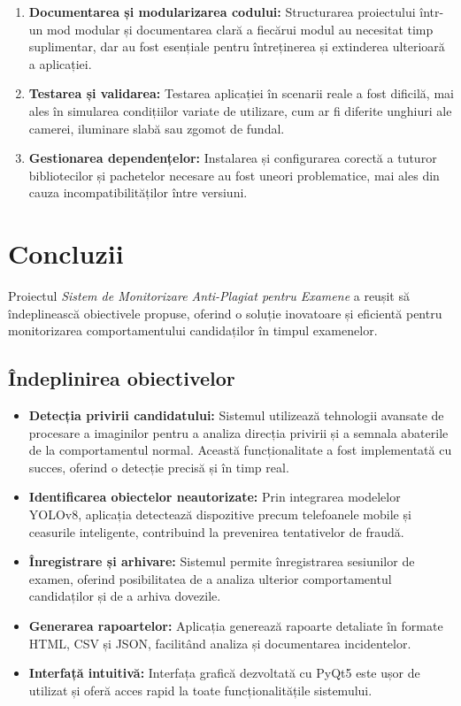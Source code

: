 \documentclass[12pt,a4paper]{article}
\begin{document}
\begin{enumerate}
    \item \textbf{Documentarea și modularizarea codului:} Structurarea proiectului într-un mod modular și documentarea clară a fiecărui modul au necesitat timp suplimentar, dar au fost esențiale pentru întreținerea și extinderea ulterioară a aplicației.

    \item \textbf{Testarea și validarea:} Testarea aplicației în scenarii reale a fost dificilă, mai ales în simularea condițiilor variate de utilizare, cum ar fi diferite unghiuri ale camerei, iluminare slabă sau zgomot de fundal.

    \item \textbf{Gestionarea dependențelor:} Instalarea și configurarea corectă a tuturor bibliotecilor și pachetelor necesare au fost uneori problematice, mai ales din cauza incompatibilităților între versiuni.
\end{enumerate}

\section{Concluzii}

Proiectul \textit{Sistem de Monitorizare Anti-Plagiat pentru Examene} a reușit să îndeplinească obiectivele propuse, oferind o soluție inovatoare și eficientă pentru monitorizarea comportamentului candidaților în timpul examenelor. 

\subsection{Îndeplinirea obiectivelor}

\begin{itemize}
    \item \textbf{Detecția privirii candidatului:} Sistemul utilizează tehnologii avansate de procesare a imaginilor pentru a analiza direcția privirii și a semnala abaterile de la comportamentul normal. Această funcționalitate a fost implementată cu succes, oferind o detecție precisă și în timp real.
    
    \item \textbf{Identificarea obiectelor neautorizate:} Prin integrarea modelelor YOLOv8, aplicația detectează dispozitive precum telefoanele mobile și ceasurile inteligente, contribuind la prevenirea tentativelor de fraudă.
    
    \item \textbf{Înregistrare și arhivare:} Sistemul permite înregistrarea sesiunilor de examen, oferind posibilitatea de a analiza ulterior comportamentul candidaților și de a arhiva dovezile.
    
    \item \textbf{Generarea rapoartelor:} Aplicația generează rapoarte detaliate în formate HTML, CSV și JSON, facilitând analiza și documentarea incidentelor.
    
    \item \textbf{Interfață intuitivă:} Interfața grafică dezvoltată cu PyQt5 este ușor de utilizat și oferă acces rapid la toate funcționalitățile sistemului.
\end{itemize}
\end{document}
